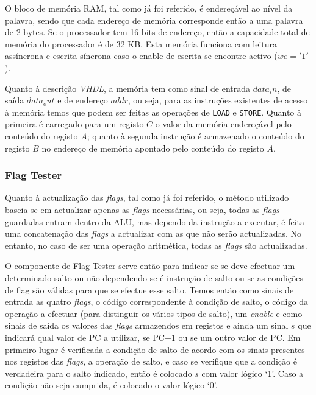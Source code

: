 \documentclass[a4paper]{article}
\begin{document}
				O bloco de memória RAM, tal como já foi referido, é endereçável ao nível da palavra, sendo que cada endereço de memória corresponde então a uma palavra de 2 bytes. Se o processador tem 16 bits de endereço, então a capacidade total de memória do processador é de 32 KB. Esta memória funciona com leitura assíncrona e escrita síncrona caso o enable de escrita se encontre activo ($we = '1'$).
				
				Quanto à descrição \emph{VHDL}, a memória tem como sinal de entrada $data_in$, de saída $data_out$ e de endereço $addr$, ou seja, para as instruções existentes de acesso à memória temos que podem ser feitas as operações de \texttt{LOAD} e \texttt{STORE}. Quanto à primeira é carregado para um registo $C$ o valor da memória endereçável pelo conteúdo do registo $A$; quanto à segunda instrução é armazenado o conteúdo do registo $B$ no endereço de memória apontado pelo conteúdo do registo $A$.
				
			\subsubsection{Flag Tester}
			
				Quanto à actualização das \textit{flags}, tal como já foi referido, o método utilizado baseia-se em actualizar apenas as \textit{flags} necessárias, ou seja, todas as \textit{flags} guardadas entram dentro da ALU, mas dependo da instrução a executar, é feita uma concatenação das \textit{flags} a actualizar com as que não serão actualizadas. No entanto, no caso de ser uma operação aritmética, todas as \textit{flags} são actualizadas.
			
				O componente de Flag Tester serve então para indicar se se deve efectuar um determinado salto ou não dependendo se é instrução de salto ou se as condições de flag são válidas para que se efectue esse salto. Temos então como sinais de entrada as quatro \textit{flags}, o código correspondente à condição de salto, o código da operação a efectuar (para distinguir os vários tipos de salto), um \textit{enable} e como sinais de saída os valores das \textit{flags} armazendos em registos e ainda um sinal $s$ que indicará qual valor de PC a utilizar, se PC+1 ou se um outro valor de PC. Em primeiro lugar é verificada a condição de salto de acordo com os sinais presentes nos registos das \textit{flags}, a operação de salto, e caso se verifique que a condição é verdadeira para o salto indicado, então é colocado $s$ com valor lógico ‘1’. Caso a condição não seja cumprida, é colocado o valor lógico ‘0’. 
				
\end{document}
